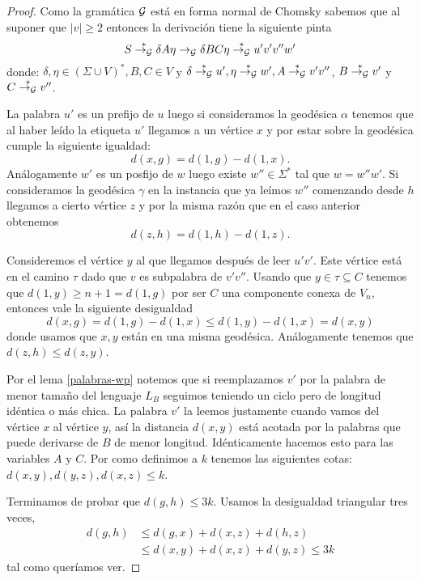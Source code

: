 \documentclass[tesis.tex]{subfiles}
\begin{document}
\begin{proof}
	Como la gramática $ {\cal G} $ está en forma normal de Chomsky sabemos que al suponer que $|v| \ge 2$ entonces la derivación tiene la siguiente pinta
	\begin{equation*}
		S \overset{*}{\to_{\cal G}} \delta A \eta \to_{\cal G} \delta BC \eta \overset{*}{\to_{\cal G}} u'v'v''w'
	\end{equation*}
	donde: $\delta, \eta \in (\Sigma \cup V)^{*},B,C \in V$ y $\delta \overset{*}{\to_{\cal G}} u', \eta \overset{*}{\to_{\cal G}} w', A \overset{*}{\to_{\cal G}} v'v''$, $B \overset{*}{\to_{\cal G}} v'$ y $C \overset{*}{\to_{\cal G}} v''$.
	
	La palabra $u'$ es un prefijo de $u$ luego si consideramos la geodésica $\alpha$ tenemos que al haber leído la etiqueta $u'$ llegamos a un vértice $x$ y por estar sobre la geodésica cumple la siguiente igualdad:
	\begin{equation*}
		d(x,g) = d(1,g) - d(1,x).
	\end{equation*}
	Análogamente $w'$ es un posfijo de $w$ luego existe $w'' \in \Sigma^{*}$ tal que $w = w'' w'$.  
	Si consideramos la geodésica $\gamma$ en la instancia que ya leímos $w''$ comenzando desde $h$ llegamos a cierto vértice $z$ y por la misma razón que en el caso anterior obtenemos
	\begin{equation*}
		d(z,h) = d(1,h) - d(1,z).
	\end{equation*}

	Consideremos el vértice $y$ al que llegamos después de leer $u'v'$.
	Este vértice está en el camino $\tau$ dado que $v$ es subpalabra de $v'v''$.
	Usando que $y \in \tau \subseteq C $ tenemos que $d(1,y) \ge n+1 = d(1,g)$ por ser $C$ una componente conexa de $V_n$, entonces vale la siguiente desigualdad
	\begin{equation*}
		d(x,g) = d(1,g) - d(1,x) \le d(1,y) - d(1,x) = d(x,y)
	\end{equation*}
	donde usamos que $x,y$ están en una misma geodésica.
	Análogamente tenemos que $d(z,h) \le d(z,y)$.
	
	
	Por el lema \ref{palabras-wp} notemos que si reemplazamos $v'$ por la palabra de menor tamaño del lenguaje $L_B$ seguimos teniendo un ciclo pero de longitud idéntica o más chica. 
	La palabra $v'$ la leemos justamente cuando vamos del vértice $x$ al vértice $y$, así la distancia  $d(x,y)$ está acotada por la palabras que puede derivarse de $B$ de menor longitud. 
	Idénticamente hacemos esto para las variables $A$ y $C$.
	Por como definimos a $k$ tenemos las siguientes cotas: 
	$d(x,y), d(y,z), d(x,z) \le k$.

	
	Terminamos de probar que $d(g,h) \le 3k$. 
	Usamos la desigualdad triangular tres veces,
	\begin{align*}
		d(g,h) & \le d(g,x) + d(x,z) + d(h,z) \\
		& \le d(x,y) + d(x,z) + d(y,z) \le 3k
	\end{align*}
	tal como queríamos ver.
	
\end{proof}	
\end{document}
